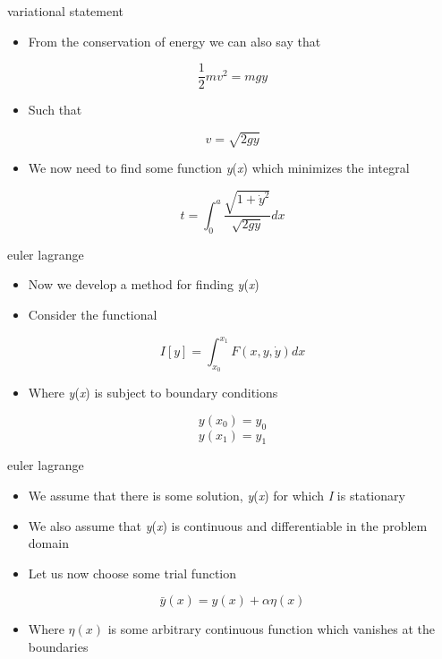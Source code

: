 \documentclass[
  letterpaper,
  ignorenonframetext,
  aspectratio=43,
  handout,
  12pt]{beamer}
\providecommand{\tightlist}{%
  \setlength{\itemsep}{0pt}\setlength{\parskip}{0pt}}
\providecommand{\tightlist}{%
\setlength{\itemsep}{0pt}\setlength{\parskip}{0pt}}
\begin{document}
\begin{frame}{variational statement}
\protect\hypertarget{variational-statement-2}{}
\begin{itemize}
\tightlist
\item
  From the conservation of energy we can also say that
\end{itemize}

\[\frac{1}{2} m v^2 = m g y\]

\begin{itemize}
\tightlist
\item
  Such that
\end{itemize}

\[v = \sqrt{2 g y}\]

\begin{itemize}
\tightlist
\item
  We now need to find some function \emph{y}(\emph{x}) which minimizes
  the integral
\end{itemize}

\[t = \int_0^a \frac{\sqrt{1 + \dot{y}^2}}{\sqrt{2 g y}}dx\]
\end{frame}

\begin{frame}{euler lagrange}
\protect\hypertarget{euler-lagrange}{}
\begin{itemize}
\tightlist
\item
  Now we develop a method for finding \emph{y}(\emph{x})
\item
  Consider the functional
\end{itemize}

\[ I[y] = \int_{x_0}^{x_1} F(x,y,\dot{y})dx\]

\begin{itemize}
\tightlist
\item
  Where \emph{y}(\emph{x}) is subject to boundary conditions
\end{itemize}

\[ y(x_0) = y_0 \] \[ y(x_1) = y_1 \]
\end{frame}

\begin{frame}{euler lagrange}
\protect\hypertarget{euler-lagrange-1}{}
\begin{itemize}
\tightlist
\item
  We assume that there is some solution, \emph{y}(\emph{x}) for which
  \emph{I} is stationary
\item
  We also assume that \emph{y}(\emph{x}) is continuous and
  differentiable in the problem domain
\item
  Let us now choose some trial function
\end{itemize}

\[\bar{y}(x) = y(x) + \alpha \eta(x)\]

\begin{itemize}
\tightlist
\item
  Where \(\eta(x)\) is some arbitrary continuous function which vanishes
  at the boundaries
\end{itemize}
\end{frame}
\end{document}
